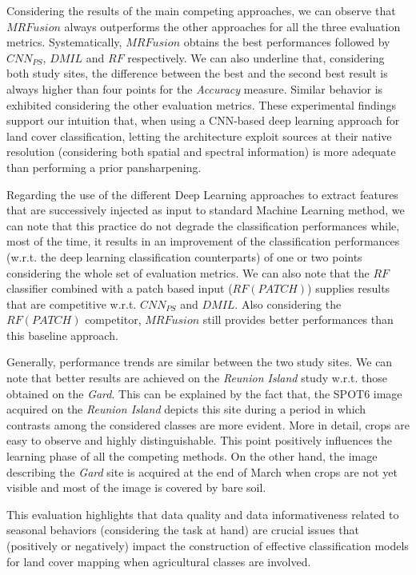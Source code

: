 \documentclass[journal]{IEEEtran}
\newcommand{\method}{$MRFusion$}
\begin{document}
Considering the results of the main competing approaches, we can observe that \method{} always outperforms the other approaches for all the three evaluation metrics. Systematically, \method{} obtains the best performances followed by $CNN_{PS}$, $DMIL$ and $RF$ respectively. We can also underline that, considering both study sites, the difference between the best and the second best result is always higher than four points for the \textit{Accuracy} measure. Similar behavior is exhibited considering the other evaluation metrics.
These experimental findings support our intuition that, when using a CNN-based deep learning approach for land cover classification, letting the architecture exploit sources at their native resolution (considering both spatial and spectral information) is more adequate than performing a prior pansharpening.

Regarding the use of the different Deep Learning approaches to extract features that are successively injected as input to standard Machine Learning method, we can note that this practice do not degrade the classification performances while, most of the time, it results in an improvement of the classification performances (w.r.t. the deep learning classification counterparts) of one or two points considering the whole set of evaluation metrics.
We can also note that the $RF$ classifier combined with a patch based input ($RF(PATCH)$) supplies results that are competitive w.r.t. $CNN_{PS}$ and $DMIL$. Also considering the $RF(PATCH)$ competitor, \method{} still provides better performances than this baseline approach.

Generally, performance trends are similar between the two study sites. We can note that better results are achieved on the \textit{Reunion Island} study w.r.t. those obtained on the \textit{Gard}. This can be explained by the fact that, the SPOT6 image acquired on the \textit{Reunion Island} depicts this site during a period in which contrasts among the considered classes are more evident. More in detail, crops are easy to observe and highly distinguishable. This point positively influences the learning phase of all the competing methods. On the other hand, the image describing the \textit{Gard} site is acquired at the end of March when crops are not yet visible and most of the image is covered by bare soil.

This evaluation highlights that data quality and data informativeness related to seasonal behaviors (considering the task at hand) are crucial issues that (positively or negatively) impact the construction of effective classification models for land cover mapping when agricultural classes are involved.
\end{document}
